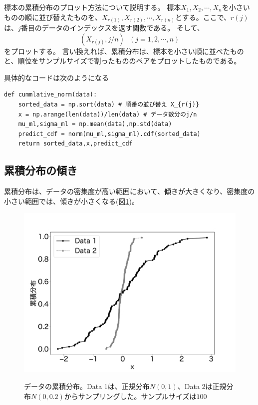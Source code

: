 標本の累積分布のプロット方法について説明する。
標本$X_1,X_2,\cdots,X_n$を小さいものの順に並び替えたものを、$X_{r(1)},X_{r(2)},\cdots,X_{r(n)}$とする。ここで、$r(j)$は、$j$番目のデータのインデックスを返す関数である。
そして、
\begin{equation*}\label{commlative_rank_eq}
    (X_{r(j)},j/n) \ \ \ (j=1,2,\cdots,n)
\end{equation*}
をプロットする。
言い換えれば、累積分布は、標本を小さい順に並べたものと、順位をサンプルサイズで割ったもののペアをプロットしたものである。

具体的なコードは次のようになる
\begin{lstlisting}
def cummlative_norm(data):
    sorted_data = np.sort(data) # 順番の並び替え X_{r(j)}
    x = np.arange(len(data))/len(data) # データ数分のj/n 
    mu_ml,sigma_ml = np.mean(data),np.std(data)
    predict_cdf = norm(mu_ml,sigma_ml).cdf(sorted_data)
    return sorted_data,x,predict_cdf
\end{lstlisting}

\subsection{累積分布の傾き}
累積分布は、データの密集度が高い範囲において、傾きが大きくなり、密集度の小さい範囲では、傾きが小さくなる(図\ref{fig:qq_ccummlative_data_example_normummlative})。


\begin{figure}
 \begin{center}
  \includegraphics[width=15cm]{./image/12_/cummlative_data_example_norm.pdf}
  \label{fig:qq_ccummlative_data_example_normummlative}
  \caption{データの累積分布。Data 1は、正規分布$N(0,1)$、Data 2は正規分布$N(0,0.2)$からサンプリングした。サンプルサイズは$100$}
 \end{center}
\end{figure}


